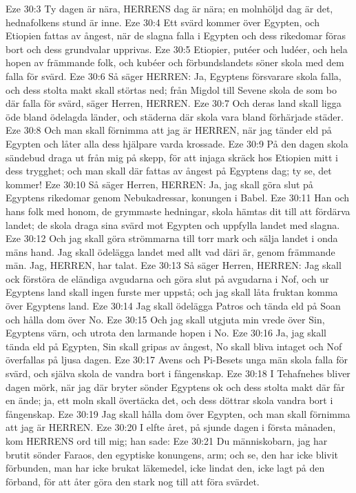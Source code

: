 Eze 30:3  Ty dagen är nära, HERRENS dag är nära; en molnhöljd dag är det, hednafolkens stund är inne.
Eze 30:4  Ett svärd kommer över Egypten, och Etiopien fattas av ångest, när de slagna falla i Egypten och dess rikedomar föras bort och dess grundvalar upprivas.
Eze 30:5  Etiopier, putéer och ludéer, och hela hopen av främmande folk, och kubéer och förbundslandets söner skola med dem falla för svärd.
Eze 30:6  Så säger HERREN: Ja, Egyptens försvarare skola falla, och dess stolta makt skall störtas ned; från Migdol till Sevene skola de som bo där falla för svärd, säger Herren, HERREN.
Eze 30:7  Och deras land skall ligga öde bland ödelagda länder, och städerna där skola vara bland förhärjade städer.
Eze 30:8  Och man skall förnimma att jag är HERREN, när jag tänder eld på Egypten och låter alla dess hjälpare varda krossade.
Eze 30:9  På den dagen skola sändebud draga ut från mig på skepp, för att injaga skräck hos Etiopien mitt i dess trygghet; och man skall där fattas av ångest på Egyptens dag; ty se, det kommer!
Eze 30:10  Så säger Herren, HERREN: Ja, jag skall göra slut på Egyptens rikedomar genom Nebukadressar, konungen i Babel.
Eze 30:11  Han och hans folk med honom, de grymmaste hedningar, skola hämtas dit till att fördärva landet; de skola draga sina svärd mot Egypten och uppfylla landet med slagna.
Eze 30:12  Och jag skall göra strömmarna till torr mark och sälja landet i onda mäns hand. Jag skall ödelägga landet med allt vad däri är, genom främmande män. Jag, HERREN, har talat.
Eze 30:13  Så säger Herren, HERREN: Jag skall ock förstöra de eländiga avgudarna och göra slut på avgudarna i Nof, och ur Egyptens land skall ingen furste mer uppstå; och jag skall låta fruktan komma över Egyptens land.
Eze 30:14  Jag skall ödelägga Patros och tända eld på Soan och hålla dom över No.
Eze 30:15  Och jag skall utgjuta min vrede över Sin, Egyptens värn, och utrota den larmande hopen i No.
Eze 30:16  Ja, jag skall tända eld på Egypten, Sin skall gripas av ångest, No skall bliva intaget och Nof överfallas på ljusa dagen.
Eze 30:17  Avens och Pi-Besets unga män skola falla för svärd, och själva skola de vandra bort i fångenskap.
Eze 30:18  I Tehafnehes bliver dagen mörk, när jag där bryter sönder Egyptens ok och dess stolta makt där får en ände; ja, ett moln skall övertäcka det, och dess döttrar skola vandra bort i fångenskap.
Eze 30:19  Jag skall hålla dom över Egypten, och man skall förnimma att jag är HERREN.
Eze 30:20  I elfte året, på sjunde dagen i första månaden, kom HERRENS ord till mig; han sade:
Eze 30:21  Du människobarn, jag har brutit sönder Faraos, den egyptiske konungens, arm; och se, den har icke blivit förbunden, man har icke brukat läkemedel, icke lindat den, icke lagt på den förband, för att åter göra den stark nog till att föra svärdet.
